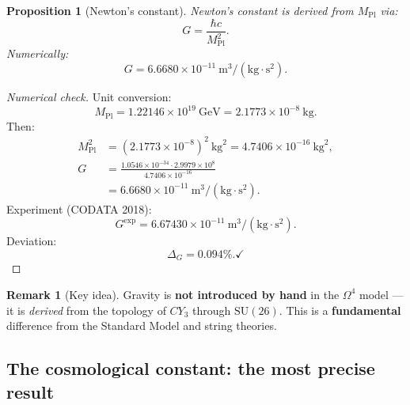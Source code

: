 \documentclass[11pt,a4paper]{article}
\newcommand{\SU}{\mathrm{SU}}
\newcommand{\CY}{CY_3}
\newcommand{\Om}{\Omega^4}
\newcommand{\Mpl}{M_{\text{Pl}}}
\newtheorem{proposition}[theorem]{Proposition}
\theoremstyle{definition}
\newtheorem{remark}[theorem]{Remark}
\begin{document}
\begin{proposition}[Newton's constant]
\label{prop:newton-constant}
Newton's constant is derived from $\Mpl$ via:
\begin{equation}
    \boxed{
    G = \frac{\hbar c}{\Mpl^2}.
    }
    \label{eq:newton-constant}
\end{equation}
Numerically:
\begin{equation}
    G = 6.6680 \times 10^{-11}~\text{m}^3/(\text{kg} \cdot \text{s}^2).
\end{equation}
\end{proposition}

\begin{proof}[Numerical check]
Unit conversion:
\begin{equation}
    \Mpl = 1.22146 \times 10^{19}~\text{GeV} 
         = 2.1773 \times 10^{-8}~\text{kg}.
\end{equation}
Then:
\begin{align}
    \Mpl^2 &= (2.1773 \times 10^{-8})^2~\text{kg}^2 
           = 4.7406 \times 10^{-16}~\text{kg}^2, \\
    G &= \frac{1.0546 \times 10^{-34} \cdot 2.9979 \times 10^8}
             {4.7406 \times 10^{-16}} \\
      &= 6.6680 \times 10^{-11}~\text{m}^3/(\text{kg} \cdot \text{s}^2).
\end{align}
Experiment (CODATA 2018):
\begin{equation}
    G^{\text{exp}} = 6.67430 \times 10^{-11}~\text{m}^3/(\text{kg} \cdot \text{s}^2).
\end{equation}
Deviation:
\begin{equation}
    \Delta_G = \mathbf{0.094\%}. \checkmark
\end{equation}
\end{proof}

\begin{remark}[Key idea]
\label{rem:gravity-key}
Gravity is \textbf{not introduced by hand} in the $\Om$ model — it is 
\emph{derived} from the topology of $\CY$ through $\SU(26)$. This is a 
\textbf{fundamental} difference from the Standard Model and 
string theories.
\end{remark}

\subsection{The cosmological constant: the most precise result}
\label{subsec:lambda}
\end{document}
